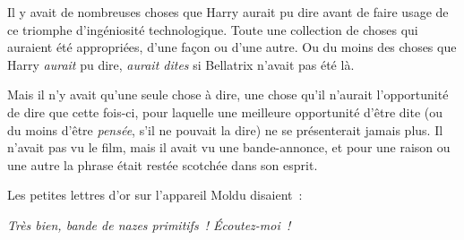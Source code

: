 Il y avait de nombreuses choses que Harry aurait pu dire avant de faire usage de ce triomphe d'ingéniosité technologique. Toute une collection de choses qui auraient été appropriées, d'une façon ou d'une autre. Ou du moins des choses que Harry \emph{aurait} pu dire, \emph{aurait dites} si Bellatrix n'avait pas été là.

Mais il n'y avait qu'une seule chose à dire, une chose qu'il n'aurait l'opportunité de dire que cette fois-ci, pour laquelle une meilleure opportunité d'être dite (ou du moins d'être \emph{pensée}, s'il ne pouvait la dire) ne se présenterait jamais plus. Il n'avait pas vu le film, mais il avait vu une bande-annonce, et pour une raison ou une autre la phrase était restée scotchée dans son esprit.

Les petites lettres d'or sur l'appareil Moldu disaient~:

\emph{Très bien, bande de nazes primitifs~! Écoutez-moi~!}

